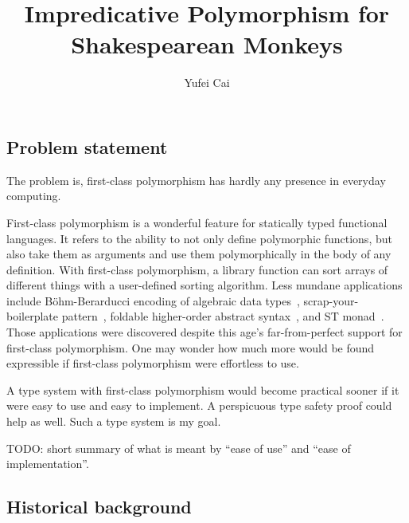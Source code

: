 \documentclass{amsart}
\title
{Impredicative Polymorphism\break
for Shakespearean Monkeys}
\author{Yufei Cai}
\begin{document}
\maketitle

\subsection{Problem statement}

The problem is, first-class polymorphism has hardly any presence
in everyday computing.

First-class polymorphism is a wonderful feature for statically
typed functional languages. It refers to the ability to not only
define polymorphic functions, but also take them as arguments and
use them polymorphically in the body of any definition. With
first-class polymorphism, a library function can sort arrays of
different things with a user-defined sorting algorithm. Less
mundane applications include B\"ohm-Berarducci encoding of
algebraic data types~\cite{Boehm85}, scrap-your-boilerplate
pattern~\cite{Laemmel03}, foldable higher-order abstract
syntax~\cite{Washburn03}, and ST monad~\cite{Launchbury94}. Those
applications were discovered despite this age's far-from-perfect
support for first-class polymorphism. One may wonder how much
more would be found expressible if first-class polymorphism were
effortless to use.

A type system with first-class polymorphism would become
practical sooner if it were easy to use and easy to implement. A
perspicuous type safety proof could help as well. Such a type
system is my goal.

TODO: short summary of what is meant by ``ease of use'' and
``ease of implementation''.

\subsection{Historical background}



\end{document}
